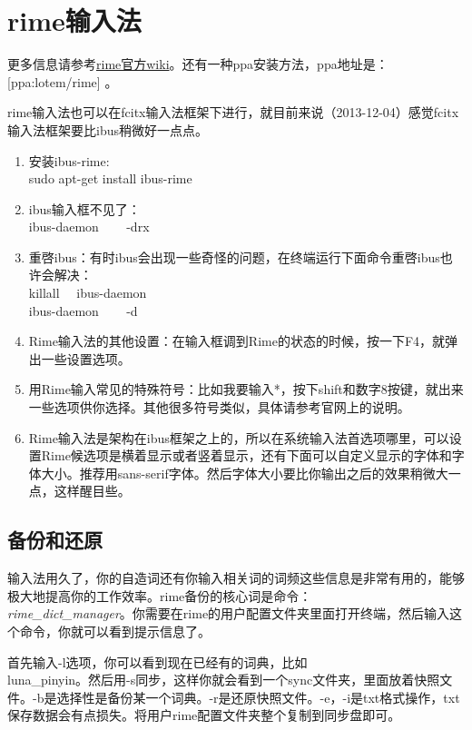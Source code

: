 \documentclass[11pt,oneside]{book}
\begin{document}
\section{rime输入法}
更多信息请参考\href{https://code.google.com/p/rimeime/w/list}{rime官方wiki}。还有一种ppa安装方法，ppa地址是：[ppa:lotem/rime] 。

rime输入法也可以在fcitx输入法框架下进行，就目前来说（2013-12-04）感觉fcitx输入法框架要比ibus稍微好一点点。

\begin{enumerate}
\item 安装ibus-rime:\\ sudo apt-get install ibus-rime
\item ibus输入框不见了：\\ ibus-daemon  ~~~  -drx
\item 重啓ibus：有时ibus会出现一些奇怪的问题，在终端运行下面命令重啓ibus也许会解决：\\ killall ~~ibus-daemon\\
             ibus-daemon ~~~ -d
\item Rime输入法的其他设置：在输入框调到Rime的状态的时候，按一下F4，就弹出一些设置选项。
\item 用Rime输入常见的特殊符号：比如我要输入*，按下shift和数字8按键，就出来一些选项供你选择。其他很多符号类似，具体请参考官网上的说明。
\item Rime输入法是架构在ibus框架之上的，所以在系统输入法首选项哪里，可以设置Rime候选项是横着显示或者竖着显示，还有下面可以自定义显示的字体和字体大小。推荐用sans-serif字体。然后字体大小要比你输出之后的效果稍微大一点，这样醒目些。
\end{enumerate}

\subsection{备份和还原}
输入法用久了，你的自造词还有你输入相关词的词频这些信息是非常有用的，能够极大地提高你的工作效率。rime备份的核心词是命令：\\ \emph{rime\_{}dict\_{}manager}。你需要在rime的用户配置文件夹里面打开终端，然后输入这个命令，你就可以看到提示信息了。

首先输入-l选项，你可以看到现在已经有的词典，比如\\ luna\_{}pinyin。然后用-s同步，这样你就会看到一个sync文件夹，里面放着快照文件。-b是选择性是备份某一个词典。-r是还原快照文件。-e，-i是txt格式操作，txt保存数据会有点损失。将用户rime配置文件夹整个复制到同步盘即可。
\end{document}
